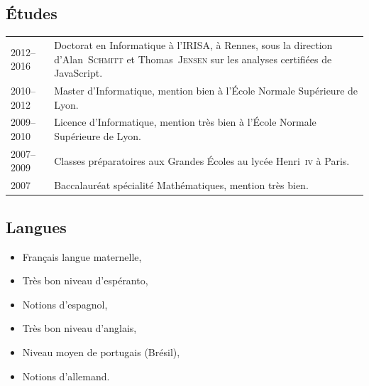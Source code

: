 \documentclass[12pt,a4paper]{article}
\makeatletter
\newenvironment{datecvsection}[1]%
               {\subsection*{#1}%
                 \noindent \begin{longtable}{@{}p{\annee}p{\texte}@{}}}
               {\end{longtable}}
\newenvironment{cvsection}[1]%
               {\subsection*{#1}}
               {}
\newcommand\familyName{\textsc}
\newcommand\placeName{}
\makeatother
\begin{document}
\begin{datecvsection}{Études}

    2012–2016 & Doctorat en Informatique à l’\placeName{IRISA}, à \placeName{Rennes}, sous la direction d’Alan~\familyName{Schmitt} et Thomas~\familyName{Jensen} sur les analyses certifiées de JavaScript. \\

	2010–2012 & Master d’Informatique, mention bien à l’École Normale Supérieure de \placeName{Lyon}. \\

	2009–2010 & Licence d’Informatique, mention très bien à l’École Normale Supérieure de \placeName{Lyon}. \\

    2007–2009 & Classes préparatoires aux Grandes Écoles au lycée \placeName{Henri~\textsc{iv}} à \placeName{Paris}. \\

	2007 & Baccalauréat spécialité Mathématiques, mention très bien. \\

\end{datecvsection}

\begin{cvsection}{Langues}
\parbox{.4\textwidth}{
\begin{itemize}
   \item Français langue maternelle,
   \item Très bon niveau d’espéranto,
   \item Notions d’espagnol,
\end{itemize}}
\parbox{.5\textwidth}{
\begin{itemize}
   \item Très bon niveau d’anglais,
	 \item Niveau moyen de portugais (Brésil),
   \item Notions d’allemand.
\end{itemize}
}
\end{cvsection}
\end{document}
